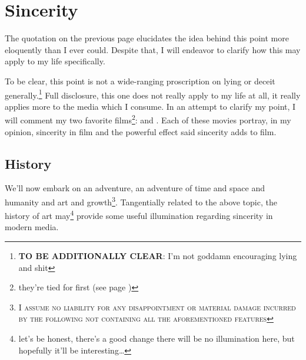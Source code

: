 \documentclass[../butidigress.tex]{subfiles}
\begin{document}
\chapter{Sincerity}\label{chap:sincerity}
\newpage

The quotation on the previous page elucidates the idea behind this point more eloquently than I ever could.
Despite that, I will endeavor to clarify how this may apply to my life specifically.

To be clear, this point is not a wide-ranging proscription on lying or deceit generally.\footnote{\textbf{TO BE ADDITIONALLY CLEAR}: I'm not goddamn encouraging lying and shit}
Full disclosure, this one does not really apply to my life at all, it really applies more to the media which I consume.
In an attempt to clarify my point, I will comment my two favorite films\footnote{they're tied for first (see page \pageref{sec:moviestopten})}:  and .
Each of these movies portray, in my opinion, sincerity in film and the powerful effect said sincerity adds to film.

\vspace{1em}

\section{History} 
We'll now embark on an adventure, an adventure of time and space and humanity and art and growth\footnote{\textsc{I assume no liability for any disappointment or material damage incurred by the following  not containing all the aforementioned features}}.
Tangentially related to the above topic, the history of art may\footnote{let's be honest, there's a good change there will be no illumination here, but hopefully it'll be interesting\ldots} provide some useful illumination regarding sincerity in modern media.
\end{document}
